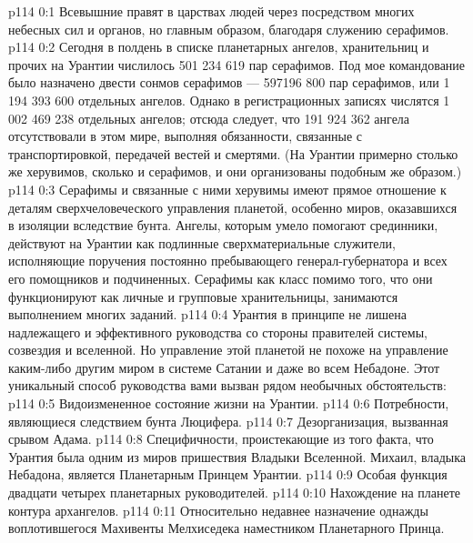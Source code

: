 \author{Глава Серафимов}
\vs p114 0:1 Всевышние правят в царствах людей через посредством многих небесных сил и органов, но главным образом, благодаря служению серафимов.
\vs p114 0:2 Сегодня в полдень в списке планетарных ангелов, хранительниц и прочих на Урантии числилось 501 234 619 пар серафимов. Под мое командование было назначено двести сонмов серафимов --- 597196 800 пар серафимов, или 1 194 393 600 отдельных ангелов. Однако в регистрационных записях числятся 1 002 469 238 отдельных ангелов; отсюда следует, что 191 924 362 ангела отсутствовали в этом мире, выполняя обязанности, связанные с транспортировкой, передачей вестей и смертями. (На Урантии примерно столько же херувимов, сколько и серафимов, и они организованы подобным же образом.)
\vs p114 0:3 Серафимы и связанные с ними херувимы имеют прямое отношение к деталям сверхчеловеческого управления планетой, особенно миров, оказавшихся в изоляции вследствие бунта. Ангелы, которым умело помогают срединники, действуют на Урантии как подлинные сверхматериальные служители, исполняющие поручения постоянно пребывающего генерал\hyp{}губернатора и всех его помощников и подчиненных. Серафимы как класс помимо того, что они функционируют как личные и групповые хранительницы, занимаются выполнением многих заданий.
\vs p114 0:4 Урантия в принципе не лишена надлежащего и эффективного руководства со стороны правителей системы, созвездия и вселенной. Но управление этой планетой не похоже на управление каким\hyp{}либо другим миром в системе Сатании и даже во всем Небадоне. Этот уникальный способ руководства вами вызван рядом необычных обстоятельств:
\vs p114 0:5 \bibnobreakspace Видоизмененное состояние жизни на Урантии.
\vs p114 0:6 \bibnobreakspace Потребности, являющиеся следствием бунта Люцифера.
\vs p114 0:7 \bibnobreakspace Дезорганизация, вызванная срывом Адама.
\vs p114 0:8 \bibnobreakspace Специфичности, проистекающие из того факта, что Урантия была одним из миров пришествия Владыки Вселенной. Михаил, владыка Небадона, является Планетарным Принцем Урантии.
\vs p114 0:9 \bibnobreakspace Особая функция двадцати четырех планетарных руководителей.
\vs p114 0:10 \bibnobreakspace Нахождение на планете контура архангелов.
\vs p114 0:11 \bibnobreakspace Относительно недавнее назначение однажды воплотившегося Махивенты Мелхиседека наместником Планетарного Принца.
